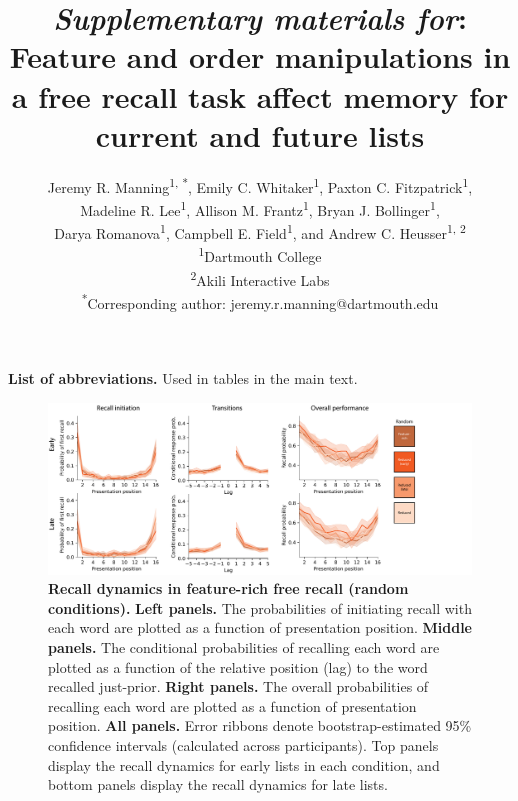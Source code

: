 \documentclass{article}
\title{\textit{Supplementary materials for}: Feature and order manipulations in
a free recall task affect memory for current and future lists}
\author{Jeremy R. Manning\textsuperscript{1, *}, Emily C.
Whitaker\textsuperscript{1}, Paxton C. Fitzpatrick\textsuperscript{1},
\\Madeline R. Lee\textsuperscript{1}, Allison M. Frantz\textsuperscript{1},
Bryan J. Bollinger\textsuperscript{1},\\Darya Romanova\textsuperscript{1},
Campbell E. Field\textsuperscript{1}, and Andrew C. Heusser\textsuperscript{1,
2}\\\textsuperscript{1}Dartmouth College\\\textsuperscript{2}Akili
Interactive Labs\\\textsuperscript{*}Corresponding author:
jeremy.r.manning@dartmouth.edu}
\date{}
\begin{document}


\setcounter{equation}{0}
\setcounter{figure}{0}
\setcounter{table}{0}
\setcounter{page}{1} 
\setcounter{section}{0}
\makeatletter
\renewcommand{\theequation}{S\arabic{equation}}
\renewcommand{\thefigure}{S\arabic{figure}}
\renewcommand{\thetable}{S\arabic{table}}
\renewcommand{\bibnumfmt}[1]{[S#1]}
\renewcommand{\citenumfont}[1]{S#1}

\maketitle
\thispagestyle{empty}

\begin{table}[p]
    \centering
    
    
    \caption{\textbf{List of abbreviations.} Used in tables in the main text.}
    
    \label{tab:abbreviations}
\end{table}

\begin{figure}[p] \centering
\includegraphics[width=\textwidth]{figures/recall_dynamics_random}

\caption{\textbf{Recall dynamics in feature-rich free recall (random
conditions).} \textbf{Left panels.} The probabilities of initiating recall with
each word are plotted as a function of presentation position. \textbf{Middle
panels.} The conditional probabilities of recalling each word are plotted as a
function of the relative position (lag) to the word recalled just-prior.
\textbf{Right panels.} The overall probabilities of recalling each word are
plotted as a function of presentation position. \textbf{All panels.} Error
ribbons denote bootstrap-estimated 95\% confidence intervals (calculated across
participants). Top panels display the recall dynamics for early lists in each
condition, and bottom panels display the recall dynamics for late lists.}

    \label{fig:recall-dynamics-random}
\end{figure}
\end{document}
